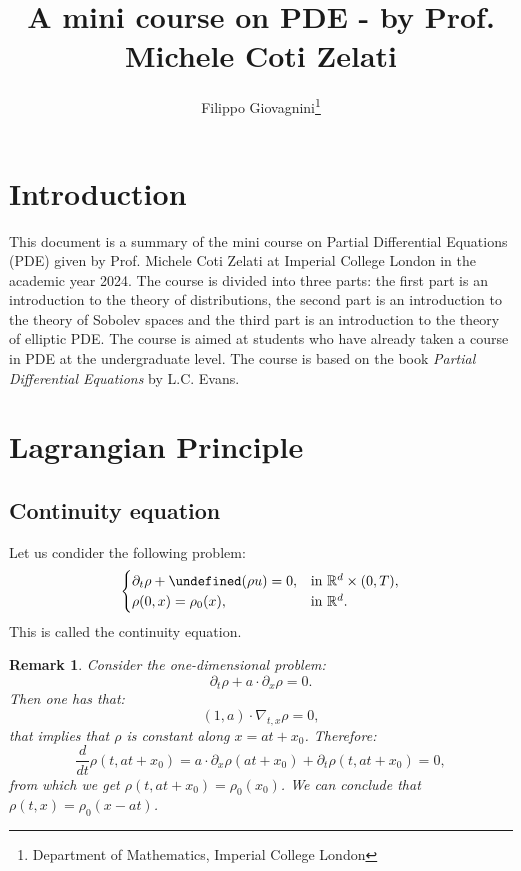 \documentclass{article}
\title{A mini course on PDE - by Prof. Michele Coti Zelati}
\author{Filippo Giovagnini\footnote{Department of Mathematics, Imperial College London}}
\newcommand{\R}{\mathbb{R}}
\let\div\undefined\DeclareMathOperator{\div}{div}
\theoremstyle{mystyle}
\theoremstyle{mystyleNormalFont}
\newtheorem{remark}[theorem]{Remark}
\theoremstyle{plain}
\let\div\undefined\DeclareMathOperator{\div}{div}
\begin{document}
\maketitle

\section{Introduction}

This document is a summary of the mini course on Partial Differential Equations (PDE) given by Prof. Michele Coti Zelati at Imperial College London in the academic year 2024. The course is divided into three parts: the first part is an introduction to the theory of distributions, the second part is an introduction to the theory of Sobolev spaces and the third part is an introduction to the theory of elliptic PDE. The course is aimed at students who have already taken a course in PDE at the undergraduate level. The course is based on the book \textit{Partial Differential Equations} by L.C. Evans.

\section{Lagrangian Principle}

\subsection{Continuity equation}

Let us condider the following problem:
\begin{equation}
    \label{eq:continuity}
    \begin{cases}
        \partial_t \rho + \div(\rho u) = 0, & \text{in } \R^d \times (0, T), \\
        \rho(0, x) = \rho_0(x), & \text{in } \R^d.
    \end{cases}
\end{equation}
This is called the continuity equation.

\begin{remark}
    Consider the one-dimensional problem:
    \begin{equation}
        \partial_t \rho + a \cdot \partial_x \rho = 0.
    \end{equation}
Then one has that:
\[
(1, a) \cdot \nabla_{t, x} \rho = 0,
\]
that implies that $\rho$ is constant along $x = a t + x_0$. Therefore:
\[
\frac{d}{dt} \rho(t, at + x_0) = a \cdot \partial_x \rho(at + x_0) + \partial_t \rho(t, at + x_0) = 0,\]
from which we get $\rho(t, at + x_0) = \rho_0(x_0)$. We can conclude that $\rho(t, x) = \rho_0(x - at)$.
\end{remark}
\end{document}
